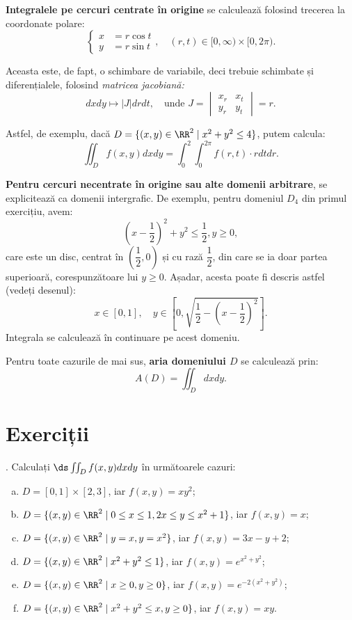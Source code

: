 \textbf{Integralele pe cercuri centrate în origine} se calculează folosind
trecerea la coordonate polare:
\[
    \begin{cases}
        x &= r \cos t \\
        y &= r \sin t
    \end{cases}, \quad (r, t) \in [0, \infty) \times [0, 2\pi).
\]

Aceasta este, de fapt, o schimbare de variabile, deci trebuie schimbate și
diferențialele, folosind \emph{matricea jacobiană:}
\[
    dxdy \mapsto |J|drdt, \quad \text{unde } %
    J = \begin{vmatrix}
        x_r & x_t \\
        y_r & y_t
    \end{vmatrix} = r.
\]

Astfel, de exemplu, dacă $ D = \{ (x, y) \in \RR^2 \mid x^2 + y^2 \leq 4 \} $,
putem calcula:
\[
    \iint_D f(x, y) dxdy = \int_0^2 \int_0^{2 \pi} f(r, t) \cdot r dtdr.
\]

\textbf{Pentru cercuri necentrate în origine sau alte domenii arbitrare},
se explicitează ca domenii intergrafic. De exemplu, pentru domeniul $ D_4 $
din primul exercițiu, avem:
\[
    \left( x - \dfrac{1}{2} \right)^2 + y^2 \leq \dfrac{1}{2}, y \geq 0,
\]
care este un disc, centrat în $ \left( \dfrac{1}{2}, 0 \right) $ și cu
rază $ \dfrac{1}{2} $, din care se ia doar partea superioară, corespunzătoare
lui $ y \geq 0 $. Așadar, acesta poate fi descris astfel (vedeți desenul):
\[
    x \in [0, 1], \quad y \in \left[0, \sqrt{\dfrac{1}{2} - (x - \dfrac{1}{2})^2}\right].
\]
Integrala se calculează în continuare pe acest domeniu.

\vspace{0.5cm}

Pentru toate cazurile de mai sus, \textbf{aria domeniului $ D $} se calculează
prin:
\[
    A(D) = \iint_D dxdy.
\]

\section{Exerciții}

\indent{}. Calculați $ \ds\iint_D f(x, y) dx dy $ în următoarele cazuri:
\begin{enumerate}[(a)]
\item $ D = [0, 1] \times [2, 3] $, iar $ f(x, y) = xy^2 $;
\item $ D = \{(x, y) \in \RR^2 \mid 0 \leq x \leq 1, 2x \leq y \leq x^2 + 1 \} $,
  iar $ f(x, y) = x $;
\item $ D = \{(x, y) \in \RR^2 \mid y = x, y = x^2 \} $, iar
  $ f(x, y) = 3x - y + 2 $;
\item $ D = \{(x, y) \in \RR^2 \mid x^2 + y^2 \leq 1 \} $,
  iar $ f(x, y) = e^{x^2 + y^2} $;
\item $ D = \{(x, y) \in \RR^2 \mid x \geq 0, y \geq 0 \} $,
  iar $ f(x, y) = e^{-2(x^2 + y^2)} $;
\item $ D = \{(x, y) \in \RR^2 \mid x^2 + y^2 \leq x, y \geq 0 \} $,
  iar $ f(x, y) = xy $.
\end{enumerate}

